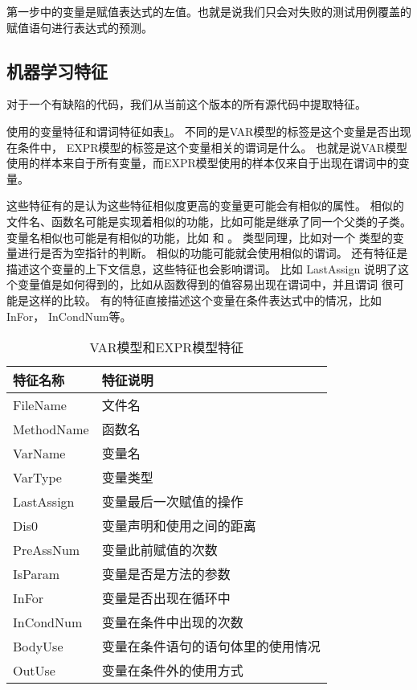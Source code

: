 第一步中的变量是赋值表达式的左值。也就是说我们只会对失败的测试用例覆盖的赋值语句进行表达式的预测。

\subsection{机器学习特征}

对于一个有缺陷的代码，我们从当前这个版本的所有源代码中提取特征。

使用的变量特征和谓词特征如表\ref{var_feature}。
不同的是VAR模型的标签是这个变量是否出现在条件中，
EXPR模型的标签是这个变量相关的谓词是什么。
也就是说VAR模型使用的样本来自于所有变量，而EXPR模型使用的样本仅来自于出现在谓词中的变量。

这些特征有的是认为这些特征相似度更高的变量更可能会有相似的属性。
相似的文件名、函数名可能是实现着相似的功能，比如可能是继承了同一个父类的子类。
变量名相似也可能是有相似的功能，比如  和 。
类型同理，比如对一个  类型的变量进行是否为空指针的判断。
相似的功能可能就会使用相似的谓词。
还有特征是描述这个变量的上下文信息，这些特征也会影响谓词。
比如 LastAssign 说明了这个变量值是如何得到的，比如从函数得到的值容易出现在谓词中，并且谓词
很可能是这样的比较。
有的特征直接描述这个变量在条件表达式中的情况，比如 InFor， InCondNum等。


\begin{table}
\centering
\caption{VAR模型和EXPR模型特征}
\begin{tabular}{|l|l|}
\hline
特征名称 & 特征说明 \\
\hline
FileName & 文件名 \\
\hline
MethodName & 函数名 \\
\hline
VarName & 变量名 \\
\hline
VarType & 变量类型 \\
\hline
LastAssign & 变量最后一次赋值的操作 \\
\hline
Dis0 & 变量声明和使用之间的距离 \\
\hline
PreAssNum & 变量此前赋值的次数 \\
\hline
IsParam & 变量是否是方法的参数 \\
\hline
InFor & 变量是否出现在循环中 \\
\hline
InCondNum & 变量在条件中出现的次数 \\
\hline
BodyUse & 变量在条件语句的语句体里的使用情况 \\
\hline
OutUse & 变量在条件外的使用方式 \\
\hline
\end{tabular}
\label{var_feature}
\end{table}

